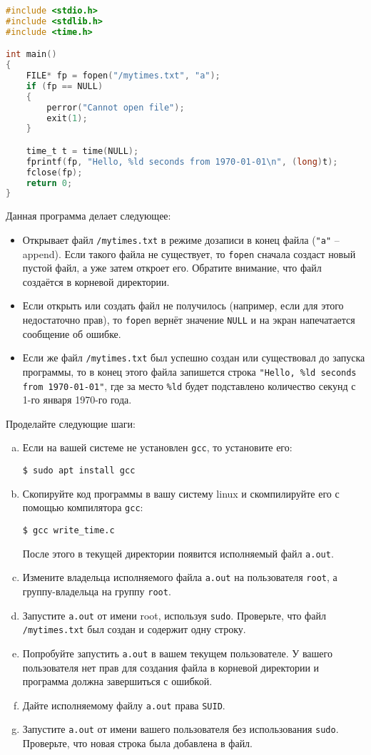 \documentclass{article}
\begin{document}
\lstset{style=csMiptCStyle}
\begin{lstlisting}[language=C]
#include <stdio.h>
#include <stdlib.h>
#include <time.h>

int main()
{
    FILE* fp = fopen("/mytimes.txt", "a");
    if (fp == NULL)
    {
        perror("Cannot open file");
        exit(1);
    }

    time_t t = time(NULL);
    fprintf(fp, "Hello, %ld seconds from 1970-01-01\n", (long)t);
    fclose(fp);
    return 0;
}
\end{lstlisting}
\lstset{style=csMiptBash}
Данная программа делает следующее:
\begin{itemize}
\item Открывает файл \texttt{/mytimes.txt} в режиме дозаписи в конец файла (\texttt{"a"} -- append). Если такого файла не существует, то \texttt{fopen} сначала создаст новый пустой файл, а уже затем откроет его. Обратите внимание, что файл создаётся в корневой директории.
\item Если открыть или создать файл не получилось (например, если для этого недостаточно прав), то \texttt{fopen} вернёт значение \texttt{NULL} и на экран напечатается сообщение об ошибке.
\item Если же файл \texttt{/mytimes.txt} был успешно создан или существовал до запуска программы, то в конец этого файла запишется строка \texttt{"Hello, \%ld seconds from 1970-01-01"}, где за место \texttt{\%ld} будет подставлено количество секунд с 1-го января 1970-го года.
\end{itemize}
Проделайте следующие шаги:
\begin{enumerate}[(a)]
\item Если на вашей системе не установлен \texttt{gcc}, то установите его:
\begin{lstlisting}
$ sudo apt install gcc
\end{lstlisting}

\item Скопируйте код программы в вашу систему linux и скомпилируйте его с помощью компилятора \texttt{gcc}:
\begin{lstlisting}
$ gcc write_time.c
\end{lstlisting}
После этого в текущей директории появится исполняемый файл \texttt{a.out}.

\item Измените владельца исполняемого файла \texttt{a.out} на пользователя \texttt{root}, а группу-владельца на группу \texttt{root}. 
\item Запустите \texttt{a.out} от имени root, используя \texttt{sudo}. Проверьте, что файл \texttt{/mytimes.txt} был создан и содержит одну строку.
\item Попробуйте запустить \texttt{a.out} в вашем текущем пользователе. У вашего пользователя нет прав для создания файла в корневой директории и программа должна завершиться с ошибкой.
\item Дайте исполняемому файлу \texttt{a.out} права \texttt{SUID}.
\item Запустите \texttt{a.out} от имени вашего пользователя без использования \texttt{sudo}. Проверьте, что новая строка была добавлена в файл.
\end{enumerate}
\end{document}
